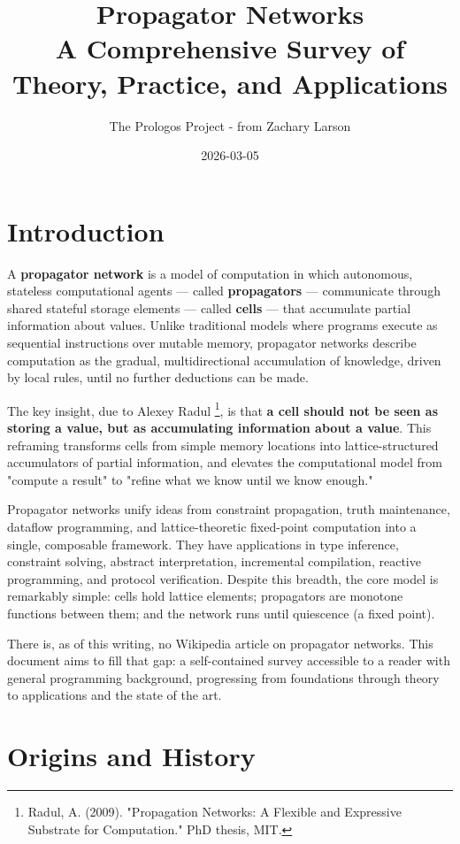 \documentclass[11pt]{article}
\author{The Prologos Project - from Zachary Larson}
\date{2026-03-05}
\title{Propagator Networks\\\medskip
\large A Comprehensive Survey of Theory, Practice, and Applications}
\begin{document}
\maketitle
\tableofcontents

\section{Introduction}
\label{sec:org1511226}

A \textbf{propagator network} is a model of computation in which autonomous,
stateless computational agents --- called \textbf{propagators} --- communicate
through shared stateful storage elements --- called \textbf{cells} --- that
accumulate partial information about values. Unlike traditional models
where programs execute as sequential instructions over mutable memory,
propagator networks describe computation as the gradual, multidirectional
accumulation of knowledge, driven by local rules, until no further
deductions can be made.

The key insight, due to Alexey Radul \footnote{Radul, A. (2009). "Propagation Networks: A Flexible
and Expressive Substrate for Computation." PhD thesis, MIT.\label{org978162e}}, is that \textbf{a cell
should not be seen as storing a value, but as accumulating information
about a value}. This reframing transforms cells from simple memory
locations into lattice-structured accumulators of partial information,
and elevates the computational model from "compute a result" to "refine
what we know until we know enough."

Propagator networks unify ideas from constraint propagation, truth
maintenance, dataflow programming, and lattice-theoretic fixed-point
computation into a single, composable framework. They have applications
in type inference, constraint solving, abstract interpretation,
incremental compilation, reactive programming, and protocol
verification. Despite this breadth, the core model is remarkably simple:
cells hold lattice elements; propagators are monotone functions between
them; and the network runs until quiescence (a fixed point).

There is, as of this writing, no Wikipedia article on propagator
networks. This document aims to fill that gap: a self-contained survey
accessible to a reader with general programming background, progressing
from foundations through theory to applications and the state of the
art.
\section{Origins and History}
\label{sec:orgfcaf9d2}
\end{document}
